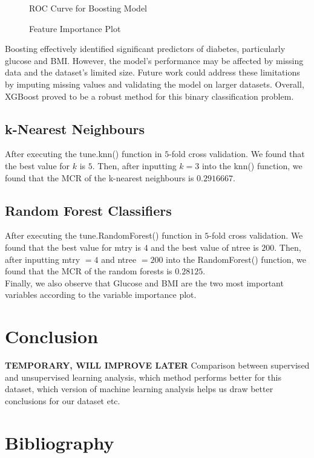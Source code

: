 \documentclass[12pt]{article}
\begin{document}
\begin{figure}[h!]
	\centering
	\begin{minipage}{0.47\textwidth}
		\caption{ROC Curve for Boosting Model}
		\label{fig:roc}
	\end{minipage}
	\hfill %
	\begin{minipage}{0.47\textwidth}
		\centering
		\caption{Feature Importance Plot}
		\label{fig:importance}
	\end{minipage}
\end{figure}


Boosting effectively identified significant predictors of diabetes, particularly glucose and BMI. However, the model's performance may be affected by missing data and the dataset's limited size. Future work could address these limitations by imputing missing values and validating the model on larger datasets. Overall, XGBoost proved to be a robust method for this binary classification problem.

\subsection{k-Nearest Neighbours}

After executing the tune.knn() function in $5$-fold cross validation. We found that the best value for $k$ is $5$. Then, after inputting $k=3$ into the knn() function, we found that the MCR of the k-nearest neighbours is $0.2916667$.

\subsection{Random Forest Classifiers}

After executing the tune.RandomForest() function in $5$-fold cross validation. We found that the best value for mtry is $4$ and the best value of ntree is $200$. Then, after inputting mtry $=4$ and ntree $=200$ into the RandomForest() function, we found that the MCR of the random forests is $0.28125$. \\
Finally, we also observe that Glucose and BMI are the two most important variables according to the variable importance plot.



\section{Conclusion}

\textbf{TEMPORARY, WILL IMPROVE LATER} Comparison between supervised and unsupervised learning analysis, which method performs better for this dataset, which version of machine learning analysis helps us draw better conclusions for our dataset etc. 

 \section{Bibliography}
  
 
\end{document}
